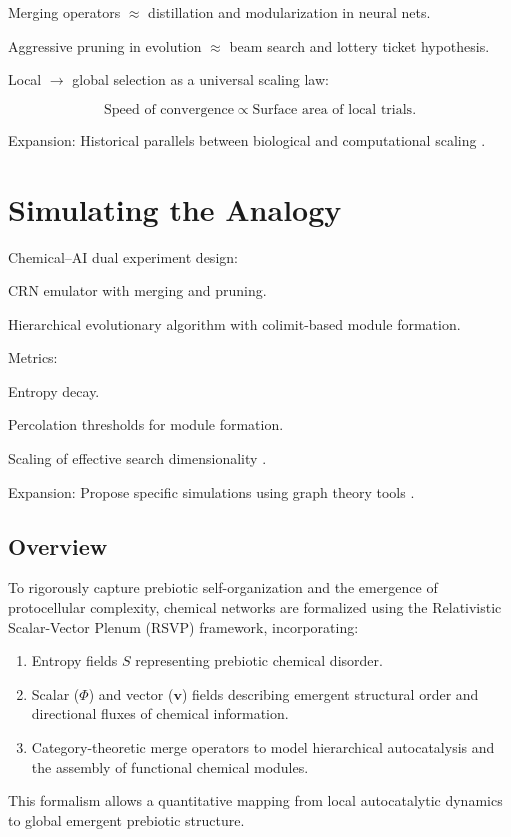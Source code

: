\documentclass[openany]{book}
\begin{document}
Merging operators $\approx$ distillation and modularization in neural nets.

Aggressive pruning in evolution $\approx$ beam search and lottery ticket hypothesis.

Local $\to$ global selection as a universal scaling law:

\[\text{Speed of convergence} \propto \text{Surface area of local trials}.\]

Expansion: Historical parallels between biological and computational scaling \citep{scalinghypothesis}.

\chapter{Simulating the Analogy}
Chemical–AI dual experiment design:

CRN emulator with merging and pruning.

Hierarchical evolutionary algorithm with colimit-based module formation.

Metrics:

Entropy decay.

Percolation thresholds for module formation.

Scaling of effective search dimensionality \citep{scalinghypothesis}.

Expansion: Propose specific simulations using graph theory tools \citep{hordijk2010}.

\section{Overview}
To rigorously capture prebiotic self-organization and the emergence of protocellular complexity, chemical networks are formalized using the Relativistic Scalar-Vector Plenum (RSVP) framework, incorporating:

\begin{enumerate}
\item Entropy fields $S$ representing prebiotic chemical disorder.
\item Scalar ($\Phi$) and vector ($\mathbf{v}$) fields describing emergent structural order and directional fluxes of chemical information.
\item Category-theoretic merge operators to model hierarchical autocatalysis and the assembly of functional chemical modules.
\end{enumerate}

This formalism allows a quantitative mapping from local autocatalytic dynamics to global emergent prebiotic structure.
\end{document}
